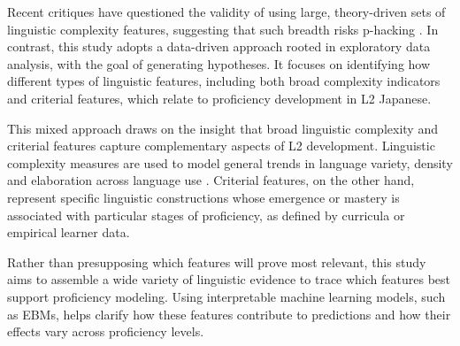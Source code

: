Recent critiques have questioned the validity of using large, theory-driven sets of linguistic complexity
features, suggesting that such breadth risks p-hacking \citep{Bulte2024}. In contrast, this study adopts a data-driven
approach
rooted in
exploratory data analysis, with the goal of generating hypotheses\citep{carmichael2017}. It focuses on identifying
how different types of linguistic features, including both broad complexity indicators and criterial features,
which relate to proficiency development in L2
Japanese.

This mixed approach draws on the insight that broad linguistic complexity and criterial features capture
complementary aspects of L2 development\citep{Hawkins_Buttery_2010, Pallotti2015}. Linguistic complexity measures
are used to model general trends in language variety, density and elaboration across language use
\citep{Butle2012, Wolfe1998}. Criterial
features, on the other hand, represent specific linguistic constructions whose emergence or mastery is associated with
particular
stages of proficiency, as defined by curricula or empirical learner data.

Rather than presupposing which features will prove most relevant, this study aims to assemble a wide variety of
linguistic evidence to trace which features best support proficiency modeling. Using interpretable machine learning
models, such as EBMs, helps clarify how these features contribute to predictions and how their effects vary across
proficiency levels.
